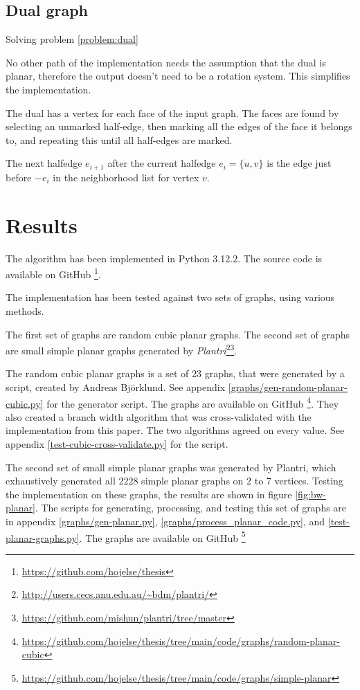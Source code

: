 \documentclass{article}
\begin{document}
		\subsection{Dual graph}\label{impl:dual}

			Solving problem \ref{problem:dual}

			No other path of the implementation needs the assumption that the dual is planar, therefore the output doesn't need to be a rotation system. This simplifies the implementation.

			The dual has a vertex for each face of the input graph. The faces are found by selecting an unmarked half-edge, then marking all the edges of the face it belongs to, and repeating this until all half-edges are marked.

			The next halfedge $e_{i+1}$ after the current halfedge $e_i = \{u, v\}$ is the edge just before $-e_i$ in the neighborhood list for vertex $v$.


\section{Results}
	The algorithm has been implemented in Python 3.12.2. The source code is available on GitHub \footnote{\url{https://github.com/hojelse/thesis}}.
	
	The implementation has been tested against two sets of graphs, using various methods.

	The first set of graphs are random cubic planar graphs. The second set of graphs are small simple planar graphs generated by \textit{Plantri}\footnote{\url{http://users.cecs.anu.edu.au/~bdm/plantri/}}\footnote{\url{https://github.com/mishun/plantri/tree/master}}.

	The random cubic planar graphs is a set of 23 graphs, that were generated by a script, created by Andreas Björklund. See appendix \ref{graphs/gen-random-planar-cubic.py} for the generator script. The graphs are available on GitHub \footnote{\url{https://github.com/hojelse/thesis/tree/main/code/graphs/random-planar-cubic}}. They also created a branch width algorithm that was cross-validated with the implementation from this paper. The two algorithms agreed on every value. See appendix \ref{test-cubic-cross-validate.py} for the script.

	The second set of small simple planar graphs was generated by Plantri, which exhaustively generated all $2228$ simple planar graphs on 2 to 7 vertices.  Testing the implementation on these graphs, the results are shown in figure \ref{fig:bw-planar}. The scripts for generating, processing, and testing this set of graphs are in appendix \ref{graphs/gen-planar.py}, \ref{graphs/process_planar_code.py}, and \ref{test-planar-graphs.py}. The graphs are available on GitHub \footnote{\url{https://github.com/hojelse/thesis/tree/main/code/graphs/simple-planar}}
\end{document}

